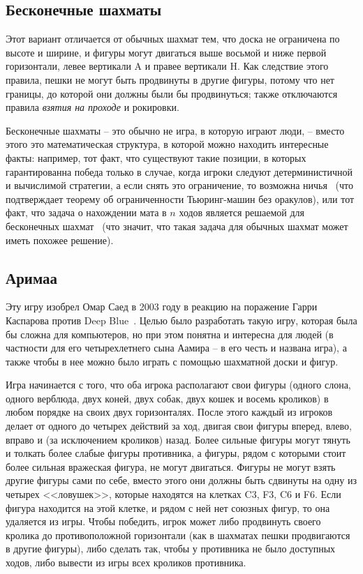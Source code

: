 \documentclass{article}
\begin{document}
\subsection{Бесконечные шахматы}

Этот вариант отличается от обычных шахмат тем, 
что доска не ограничена по высоте и ширине,
и фигуры могут двигаться выше восьмой и ниже первой горизонтали,
левее вертикали A и правее вертикали H.
Как следствие этого правила, пешки не могут быть продвинуты в другие фигуры, потому что нет границы, до которой они должны были бы продвинуться;
также отключаются правила \emph{взятия на проходе} и рокировки.

Бесконечные шахматы -- это обычно не игра, в которую играют люди, --
вместо этого это математическая структура, в которой можно находить интересные факты:
например, тот факт, что существуют такие позиции,
в которых гарантированна победа только в случае, когда игроки следуют
детерминистичной и вычислимой стратегии, а если снять это ограничение, то возможна ничья~\cite{transfinite-game-values} 
(что подтверждает теорему об ограниченности Тьюринг-машин без оракулов),
или тот факт, что задача о нахождении мата в $n$ ходов 
является решаемой для бесконечных шахмат~\cite{infinite-mate-in-n}
(что значит, что такая задача для обычных шахмат может иметь похожее решение).

\subsection{Аримаа}

Эту игру изобрел Омар Саед в 2003 году в реакцию на поражение Гарри Каспарова против Deep Blue~\cite{arimaa}.
Целью было разработать такую игру, которая была бы сложна для компьютеров,
но при этом понятна и интересна для людей (в частности для его четырехлетнего сына Аамира -- в его честь и названа игра),
а также чтобы в нее можно было играть с помощью шахматной доски и фигур.

Игра начинается с того, что оба игрока располагают свои фигуры (одного слона, одного верблюда, двух коней, двух собак, двух кошек и восемь кроликов)
в любом порядке на своих двух горизонталях.
После этого каждый из игроков делает от одного до четырех действий за ход,
двигая свои фигуры вперед, влево, вправо и (за исключением кроликов) назад.
Более сильные фигуры могут тянуть и толкать более слабые фигуры противника,
а фигуры, рядом с которыми стоит более сильная вражеская фигура, не могут двигаться.
Фигуры не могут взять другие фигуры сами по себе,
вместо этого они должны быть сдвинуты на одну из четырех <<ловушек>>,
которые находятся на клетках C3, F3, C6 и F6.
Если фигура находится на этой клетке, и рядом с ней нет союзных фигур,
то она удаляется из игры.
Чтобы победить, игрок может либо продвинуть своего кролика до противоположной горизонтали
(как в шахматах пешки продвигаются в другие фигуры),
либо сделать так, чтобы у противника не было доступных ходов,
либо вывести из игры всех кроликов противника.
\end{document}

